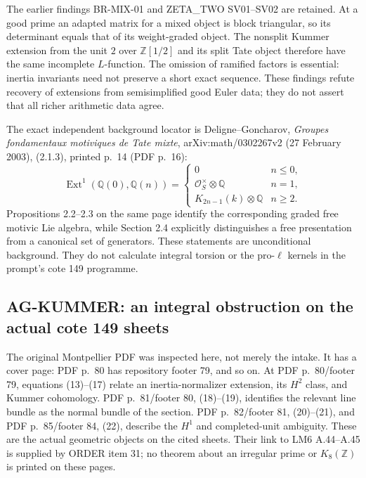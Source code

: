 \documentclass[11pt,a4paper]{article}
\begin{document}
The earlier findings BR-MIX-01 and ZETA\_TWO SV01--SV02 are retained.
At a good prime an adapted matrix for a mixed object is block triangular,
so its determinant equals that of its weight-graded object. The nonsplit
Kummer extension from the unit $2$ over $\mathbb Z[1/2]$ and its split
Tate object therefore have the same incomplete $L$-function. The omission
of ramified factors is essential: inertia invariants need not preserve a
short exact sequence. These findings refute recovery of extensions from
semisimplified good Euler data; they do not assert that all richer
arithmetic data agree.

The exact independent background locator is Deligne--Goncharov,
\emph{Groupes fondamentaux motiviques de Tate mixte},
arXiv:math/0302267v2 (27 February 2003), (2.1.3), printed p.~14
(PDF p.~16):
\[
 \operatorname{Ext}^1(\mathbb Q(0),\mathbb Q(n))=
 \begin{cases}
 0&n\le0,\\
 \mathcal O_S^\times\otimes\mathbb Q&n=1,\\
 K_{2n-1}(k)\otimes\mathbb Q&n\ge2.
 \end{cases}
\]
Propositions 2.2--2.3 on the same page identify the corresponding graded
free motivic Lie algebra, while Section 2.4 explicitly distinguishes a
free presentation from a canonical set of generators. These statements
are unconditional background. They do not calculate integral torsion or
the pro-$\ell$ kernels in the prompt's cote 149 programme.

\subsection{AG-KUMMER: an integral obstruction on the actual cote 149 sheets}
\label{ag:kummer}

The original Montpellier PDF was inspected here, not merely the intake.
It has a cover page: PDF p.~80 has repository footer 79, and so on.
At PDF p.~80/footer 79, equations (13)--(17) relate an inertia-normalizer
extension, its $H^2$ class, and Kummer cohomology. PDF p.~81/footer 80,
(18)--(19), identifies the relevant line bundle as the normal bundle of
the section. PDF p.~82/footer 81, (20)--(21), and PDF p.~85/footer 84,
(22), describe the $H^1$ and completed-unit ambiguity. These are the
actual geometric objects on the cited sheets. Their link to LM6
A.44--A.45 is supplied by ORDER item 31; no theorem about an irregular
prime or $K_8(\mathbb Z)$ is printed on these pages.
\end{document}
